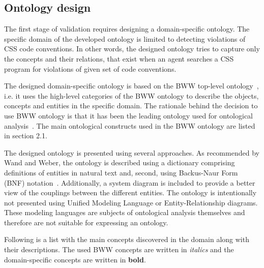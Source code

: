 \subsection{Ontology design}

The first stage of validation requires designing a domain-specific ontology.
The specific domain of the developed ontology is limited to detecting
violations of CSS code conventions. In other words, the designed ontology
tries to capture only the concepts and their relations, that exist when an
agent searches a CSS program for violations of given set of code conventions.

The designed domain-specific ontology is based on the BWW top-level
ontology~\cite{wand1990ontological}, i.e. it uses the high-level categories of
the BWW ontology to describe the objects, concepts and entities in the
specific domain. The rationale behind the decision to use BWW ontology is that
it has been the leading ontology used for ontological
analysis~\cite{moody2009physics}. The main ontological constructs used in the
BWW ontology are listed in section 2.1.

The designed ontology is presented using several approaches. As recommended by
Wand and Weber, the ontology is described using a dictionary comprising
definitions of entities in natural text and, second, using Backus-Naur Form
(BNF) notation~\cite{wand1995deep,rosemann2002developing}. Additionally, a
system diagram is included to provide a better view of the couplings between
the different entities. The ontology is intentionally not presented using
Unified Modeling Language or Entity-Relationship diagrams. These modeling
languages are subjects of ontological analysis themselves and therefore are
not suitable for expressing an ontology.

Following is a list with the main concepts discovered in the domain along with
their descriptions. The used BWW concepts are written in \textit{italics} and
the domain-specific concepts are written in \textbf{bold}.

